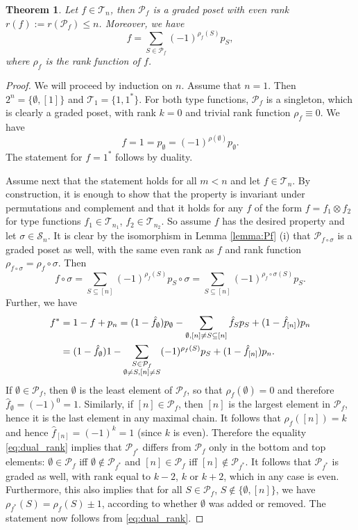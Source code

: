 \documentclass[12pt]{article}
\newtheorem{theorem}{Theorem}
\theoremstyle{definition}
\theoremstyle{remark}
\def\Te{\mathcal T}
\def\Pe{\mathcal P}
\def\permut{\mathscr{S}}
\begin{document}
\begin{theorem}\label{thm:graded} Let $f\in \Te_n$, then $\mathcal P_f$ is a graded poset
with even rank $r(f):=r(\Pe_f)\le n$.  Moreover, we have
\[
f=\sum_{S\in \mathcal P_f}(-1)^{\rho_f(S)}p_S,
\]
where $\rho_f$ is the rank function of $f$.

\end{theorem}


\begin{proof} We will proceed by induction on $n$. Assume that  $n=1$. Then  $2^n=\{\emptyset, [1]\}$ and
$\Te_1=\{1,1^*\}$. For both type functions, $\mathcal P_f$ is a singleton, which 
is clearly a graded poset, with rank $k=0$ and trivial rank function $\rho_f\equiv 0$.  We have
\[
f = 1=p_\emptyset=(-1)^{\rho(\emptyset)}p_\emptyset.
\]
The statement for $f=1^*$ follows by duality.  

Assume next that the statement holds for all $m<n$ and let $f\in \Te_n$. By construction,
it is enough to show that the property is invariant under permutations and complement and
that it holds for any $f$ of the form 
$f=f_1\otimes f_2$ for  type functions $f_1\in \Te_{n_1}$, $f_2\in \Te_{n_2}$.
So assume $f$ has the desired property and let $\sigma\in \permut_n$. 
It is clear by the
isomorphism in Lemma \ref{lemma:Pf} (i) that $\Pe_{f\circ\sigma}$ is a graded poset as
well, with the same even rank as $f$ and rank function
$\rho_{f\circ\sigma}=\rho_f\circ \sigma$. Then
\[
f\circ \sigma=\sum_{S\subseteq [n]} (-1)^{\rho_f(S)}p_S\circ\sigma=\sum_{S\subseteq [n]}
(-1)^{\rho_f\circ \sigma(S)}p_S.
\]
Further, we have
\begin{align}
f^*&=1-f+p_n=(1-\hat f_\emptyset)p_\emptyset -
\sum_{\emptyset, [n]\ne S\subseteq [n]} \hat f_Sp_S+(1-\hat f_{[n]})p_n\notag\\
&=(1-\hat f_\emptyset)1 -\sum_{\substack{S\in \mathcal P_f\\ \emptyset \ne S,
[n]\ne S}}
(-1)^{\rho_f(S)}p_S+(1- \hat f_{[n]})p_n.\label{eq:dual_rank}
\end{align}
If $\emptyset \in \Pe_f$, then $\emptyset$ is the least element of $\Pe_f$, so that 
$\rho_f(\emptyset)=0$ and therefore $\hat f_\emptyset =
(-1)^0=1$. Similarly, if $[n]\in \Pe_f$, then $[n]$ is the largest element in $\Pe_f$,
hence it is the last element in any maximal chain. It follows that $\rho_f([n])=k$ and hence
$\hat f_{[n]}=(-1)^k=1$ (since $k$ is even). 
Therefore the equality \eqref{eq:dual_rank} implies that $\mathcal P_{f^*}$ differs from $\mathcal P_f$ only in the bottom  and
top elements:  $\emptyset \in \mathcal P_f$ iff  $\emptyset \notin \mathcal P_{f^*}$
and $[n] \in \mathcal P_f$ iff  $[n] \notin \mathcal P_{f^*}$. It follows that $\mathcal
P_{f^*}$ is graded as well, with rank  equal to $k-2$, $k$ or $k+2$, which in any case
is even. Furthermore,  this also implies 
that for all $S\in \Pe_f$, $S\notin \{\emptyset, [n]\}$, we
have  $\rho_{f^*}(S)=\rho_f(S)\pm 1$, according to whether $\emptyset$ was added or removed. The
statement now follows from \eqref{eq:dual_rank}. 



\end{proof}
\end{document}
